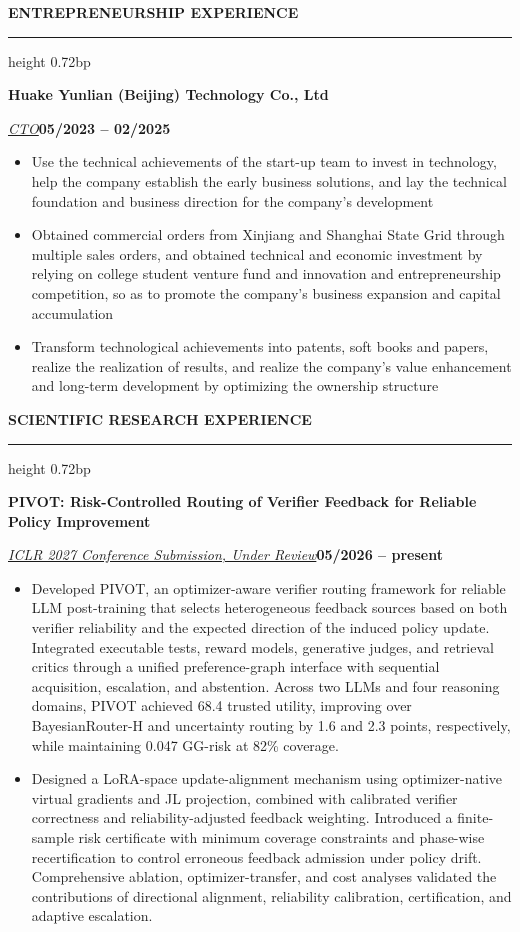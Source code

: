 \documentclass[10pt,a4paper]{article}
\newcommand{\sectionrule}[1]{%
  \par\vspace{3.36bp}\noindent\textbf{#1}\par\vspace{2.62bp}%
  \hrule height 0.72bp\vspace{2.34bp}%
}
\newcommand{\compactsectionrule}[1]{%
  \par\vspace{0.24bp}\noindent\textbf{#1}\par\vspace{2.62bp}%
  \hrule height 0.72bp\vspace{0.66bp}%
}
\newcommand{\jobcompany}[2]{\par\vspace{1.92bp}\noindent\textbf{#1}\hfill\textbf{#2}\par\vspace{1.44bp}}
\newcommand{\titleline}[1]{\par\noindent\textbf{#1}\par}
\newcommand{\roleline}[2]{\par\noindent\uline{\textit{#1}}\hfill\textbf{#2}\par}
\newcommand{\venueline}[2]{\par\noindent\uline{\textit{#1}}\hfill\textbf{#2}\par}
\newenvironment{cvitems}{%
  \begin{itemize}[leftmargin=14.20bp,labelwidth=4.20bp,labelsep=10.00bp,align=left,
    topsep=0bp,itemsep=0bp,parsep=0bp,partopsep=0bp,label={\textbullet}]
}{\end{itemize}}
\begin{document}
\sectionrule{ENTREPRENEURSHIP EXPERIENCE}
\jobcompany{Huake Yunlian (Beijing) Technology Co., Ltd}{}
\roleline{CTO}{05/2023 -- 02/2025}
\begin{cvitems}
\item Use the technical achievements of the start-up team to invest in technology, help the company establish the early business solutions, and lay the technical foundation and business direction for the company's development
\item Obtained commercial orders from Xinjiang and Shanghai State Grid through multiple sales orders, and obtained technical and economic investment by relying on college student venture fund and innovation and entrepreneurship competition, so as to promote the company's business expansion and capital accumulation
\item Transform technological achievements into patents, soft books and papers, realize the realization of results, and realize the company's value enhancement and long-term development by optimizing the ownership structure
\end{cvitems}

\compactsectionrule{SCIENTIFIC RESEARCH EXPERIENCE}
\titleline{PIVOT: Risk-Controlled Routing of Verifier Feedback for Reliable Policy Improvement}
\venueline{ICLR 2027 Conference Submission, Under Review}{05/2026 -- present}
\begin{cvitems}
\item Developed PIVOT, an optimizer-aware verifier routing framework for reliable LLM post-training that selects heterogeneous feedback sources based on both verifier reliability and the expected direction of the induced policy update. Integrated executable tests, reward models, generative judges, and retrieval critics through a unified preference-graph interface with sequential acquisition, escalation, and abstention. Across two LLMs and four reasoning domains, PIVOT achieved 68.4 trusted utility, improving over BayesianRouter-H and uncertainty routing by 1.6 and 2.3 points, respectively, while maintaining 0.047 GG-risk at 82\% coverage.
\item Designed a LoRA-space update-alignment mechanism using optimizer-native virtual gradients and JL projection, combined with calibrated verifier correctness and reliability-adjusted feedback weighting. Introduced a finite-sample risk certificate with minimum coverage constraints and phase-wise recertification to control erroneous feedback admission under policy drift. Comprehensive ablation, optimizer-transfer, and cost analyses validated the contributions of directional alignment, reliability calibration, certification, and adaptive escalation.
\end{cvitems}
\end{document}

